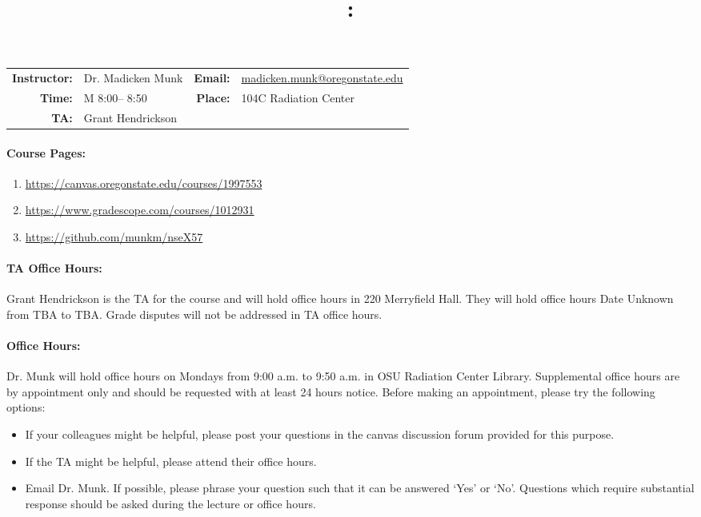 \documentclass[11pt, a4paper]{article}
\title{\CourseNumber: \CourseTitle\\}
\author{\CourseUniversity}
\date{\CourseSemester \CourseYear}
\makeatletter
\newcommand{\CourseInstructor}{Dr. Madicken Munk\xspace}%
\newcommand{\CourseDays}{M\xspace}%
\newcommand{\CourseStart}{8:00\xspace}%
\newcommand{\CourseEnd}{8:50\xspace}%
\newcommand{\CourseInstructorEmail}{madicken.munk@oregonstate.edu}
\newcommand{\CourseRoom}{104C\xspace}%
\newcommand{\CourseBuilding}{Radiation Center\xspace}%
\newcommand{\TeachingAssistant}{Grant Hendrickson \xspace}%
\newcommand{\TAOfficeHourDays}{Date Unknown \xspace}%
\newcommand{\TAOfficeHourStart}{TBA\xspace}%
\newcommand{\TAOfficeHourEnd}{TBA\xspace}%
\newcommand{\TAOfficeHourPlace}{220 Merryfield Hall\xspace}
\newcommand{\MunkOfficeHourDays}{Mondays\xspace}%
\newcommand{\MunkOfficeHourStart}{9:00 a.m.\xspace}%
\newcommand{\MunkOfficeHourEnd}{9:50 a.m.\xspace}%
\newcommand{\MunkOfficeHourPlace}{OSU Radiation Center Library\xspace}
\makeatother
\begin{document}
\maketitle
\renewcommand{\arraystretch}{1.5}
\begin{center}
\begin{table}[h]
\begin{tabularx}{\textwidth}{rXrX}
\hline
\textbf{Instructor:} & \CourseInstructor & \textbf{Email:} & \href{mailto:\CourseInstructorEmail}{\CourseInstructorEmail} \\
\textbf{Time:} & \CourseDays \CourseStart -- \CourseEnd & \textbf{Place:} & \CourseRoom \CourseBuilding \\
\textbf{TA:} & \TeachingAssistant & & \\
\hline
\end{tabularx}
\end{table}
\end{center}

\paragraph{Course Pages:}
\begin{enumerate}
        \item \url{https://canvas.oregonstate.edu/courses/1997553}
        \item \url{https://www.gradescope.com/courses/1012931}
        \item \url{https://github.com/munkm/nseX57}
\end{enumerate}

\paragraph{TA Office Hours:} \TeachingAssistant is the TA for the course and will hold
office hours in \TAOfficeHourPlace.
They will hold office hours \TAOfficeHourDays from
\TAOfficeHourStart to \TAOfficeHourEnd.
Grade disputes will not be addressed in TA office hours.

\paragraph{Office Hours:} Dr. Munk  will hold office hours 
on
\MunkOfficeHourDays from \MunkOfficeHourStart to \MunkOfficeHourEnd in
\MunkOfficeHourPlace. Supplemental office hours are 
by appointment only
and should be requested with at least 24 hours notice.
Before making an appointment, please try the following options:
\begin{itemize}
\item If your colleagues might be helpful, please post your questions in the
        canvas discussion forum provided for this purpose.
\item If the TA might be helpful, please attend their office hours.
\item Email Dr. Munk. If possible, please phrase your question such that it
        can be answered `Yes' or `No'. Questions which require substantial
        response should be asked during the lecture or office hours.
\end{itemize}
\end{document}
